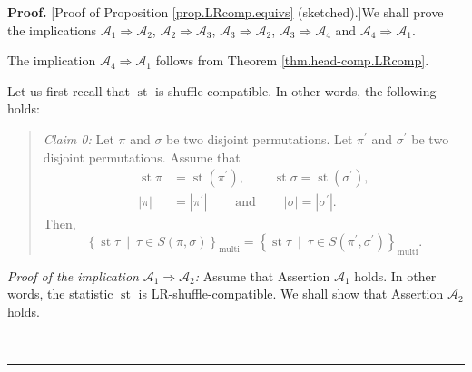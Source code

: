 \documentclass[numbers=enddot,12pt,final,onecolumn,notitlepage]{scrartcl}%
\theoremstyle{definition}
\newenvironment{statement}{\begin{quote}}{\end{quote}}
\newenvironment{proof}[1][Proof]{\noindent\textbf{#1.} }{\ \rule{0.5em}{0.5em}}
\newenvironment{verlong}{}{}
\newenvironment{noncompile}{}{}
\begin{document}
\begin{verlong}
\begin{proof}
[Proof of Proposition \ref{prop.LRcomp.equivs} (sketched).]We shall prove the
implications $\mathcal{A}_{1}\Longrightarrow\mathcal{A}_{2}$, $\mathcal{A}%
_{2}\Longrightarrow\mathcal{A}_{3}$, $\mathcal{A}_{3}\Longrightarrow
\mathcal{A}_{2}$, $\mathcal{A}_{3}\Longrightarrow\mathcal{A}_{4}$ and
$\mathcal{A}_{4}\Longrightarrow\mathcal{A}_{1}$.

The implication $\mathcal{A}_{4}\Longrightarrow\mathcal{A}_{1}$ follows from
Theorem \ref{thm.head-comp.LRcomp}.

\begin{noncompile}
Let us first recall that $\operatorname{st}$ is shuffle-compatible. In other
words, the following holds:

\begin{statement}
\textit{Claim 0:} Let $\pi$ and $\sigma$ be two disjoint permutations. Let
$\pi^{\prime}$ and $\sigma^{\prime}$ be two disjoint permutations. Assume that%
\begin{align*}
\operatorname{st} \pi    &  =\operatorname{st}\left(
\pi^{\prime}\right)  ,\ \ \ \ \ \ \ \ \ \ \operatorname{st} \sigma
=\operatorname{st}\left(  \sigma^{\prime}\right)  ,\\
\left\vert \pi\right\vert  &  =\left\vert \pi^{\prime}\right\vert
\ \ \ \ \ \ \ \ \ \ \text{and}\ \ \ \ \ \ \ \ \ \ \left\vert \sigma\right\vert
=\left\vert \sigma^{\prime}\right\vert .
\end{align*}
Then,
\[
\left\{  \operatorname{st} \tau   \ \mid\ \tau\in S\left(
\pi,\sigma\right)  \right\}  _{\operatorname*{multi}}=\left\{
\operatorname{st} \tau   \ \mid\ \tau\in S\left(  \pi^{\prime
},\sigma^{\prime}\right)  \right\}  _{\operatorname*{multi}}.
\]

\end{statement}
\end{noncompile}

\textit{Proof of the implication }$\mathcal{A}_{1}\Longrightarrow
\mathcal{A}_{2}$\textit{:} Assume that Assertion $\mathcal{A}_{1}$ holds. In
other words, the statistic $\operatorname{st}$ is LR-shuffle-compatible. We
shall show that Assertion $\mathcal{A}_{2}$ holds.


\end{proof}
\end{verlong}
\end{document}
